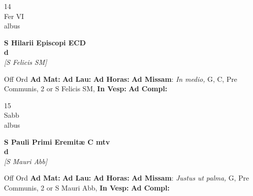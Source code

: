 \documentclass[10pt, openany]{book}
\begin{document}
        \begin{center}
            \begin{minipage}{3.5in}
                \vspace{2em}
                \begin{minipage}{0.5in}
                    {\Huge 14} \\
                    {\normalsize Fer VI} \\
                    {\normalsize albus}
                \end{minipage}
                \begin{minipage}{3.0in}
                    \textbf{ \large S Hilarii Episcopi ECD \\
                    \textnormal{\normalsize d}} \\ \textit{[S Felicis SM]} \\ 
                \end{minipage}
                \begin{justify}Off Ord
                    \textbf{Ad Mat: }
                    \textbf{Ad Lau: }
                    \textbf{Ad Horas: }\textbf{Ad Missam}: \textit{In medio,} G, C, Pre Communis, 2 or S Felicis SM,  
                    \textbf{In Vesp: }
                    \textbf{Ad Compl: }
                \end{justify}
            \end{minipage}
        \end{center}
    
        \begin{center}
            \begin{minipage}{3.5in}
                \vspace{2em}
                \begin{minipage}{0.5in}
                    {\Huge 15} \\
                    {\normalsize Sabb} \\
                    {\normalsize albus}
                \end{minipage}
                \begin{minipage}{3.0in}
                    \textbf{ \large S Pauli Primi Eremitæ C mtv \\
                    \textnormal{\normalsize d}} \\ \textit{[S Mauri Abb]} \\ 
                \end{minipage}
                \begin{justify}Off Ord
                    \textbf{Ad Mat: }
                    \textbf{Ad Lau: }
                    \textbf{Ad Horas: }\textbf{Ad Missam}: \textit{Justus ut palma,} G, Pre Communis, 2 or S Mauri Abb,  
                    \textbf{In Vesp: }
                    \textbf{Ad Compl: }
                \end{justify}
            \end{minipage}
        \end{center}
    
\end{document}
